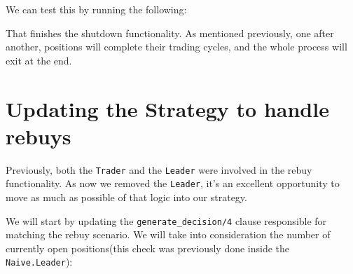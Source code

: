 \documentclass[
  oneside]{book}
\newenvironment{Shaded}{\begin{snugshade}}{\end{snugshade}}
\newcommand{\AttributeTok}[1]{\textcolor[rgb]{0.13,0.29,0.53}{#1}}
\newcommand{\BuiltInTok}[1]{#1}
\newcommand{\ErrorTok}[1]{\textcolor[rgb]{0.64,0.00,0.00}{\textbf{#1}}}
\newcommand{\ExtensionTok}[1]{#1}
\newcommand{\KeywordTok}[1]{\textcolor[rgb]{0.13,0.29,0.53}{\textbf{#1}}}
\newcommand{\NormalTok}[1]{#1}
\newcommand{\OperatorTok}[1]{\textcolor[rgb]{0.81,0.36,0.00}{\textbf{#1}}}
\newcommand{\PreprocessorTok}[1]{\textcolor[rgb]{0.56,0.35,0.01}{\textit{#1}}}
\newcommand{\SpecialStringTok}[1]{\textcolor[rgb]{0.31,0.60,0.02}{#1}}
\newcommand{\StringTok}[1]{\textcolor[rgb]{0.31,0.60,0.02}{#1}}
\begin{document}
We can test this by running the following:

\begin{Shaded}
\end{Shaded}

That finishes the shutdown functionality. As mentioned previously, one after another, positions will complete their trading cycles, and the whole process will exit at the end.

\section{Updating the Strategy to handle rebuys}\label{updating-the-strategy-to-handle-rebuys}

Previously, both the \texttt{Trader} and the \texttt{Leader} were involved in the rebuy functionality. As now we removed the \texttt{Leader}, it's an excellent opportunity to move as much as possible of that logic into our strategy.

We will start by updating the \texttt{generate\_decision/4} clause responsible for matching the rebuy scenario. We will take into consideration the number of currently open positions(this check was previously done inside the \texttt{Naive.Leader}):
\end{document}
